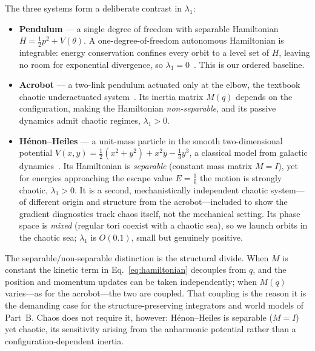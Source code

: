 \documentclass[11pt]{article}
\begin{document}
The three systems form a deliberate contrast in $\lambda_1$:
\begin{itemize}
\item \textbf{Pendulum} --- a single degree of freedom with separable Hamiltonian $H=\tfrac{1}{2}p^2 + V(\theta)$. A one-degree-of-freedom autonomous Hamiltonian is integrable: energy conservation confines every orbit to a level set of $H$, leaving no room for exponential divergence, so $\lambda_1=0$~\cite{arnold1989mathematical}. This is our ordered baseline.
\item \textbf{Acrobot} --- a two-link pendulum actuated only at the elbow, the textbook chaotic underactuated system~\cite{spong1995swing}. Its inertia matrix $M(q)$ depends on the configuration, making the Hamiltonian \emph{non-separable}, and its passive dynamics admit chaotic regimes, $\lambda_1>0$.
\item \textbf{Hénon--Heiles} --- a unit-mass particle in the smooth two-dimensional potential $V(x,y)=\tfrac{1}{2}(x^2+y^2)+x^2y-\tfrac{1}{3}y^3$, a classical model from galactic dynamics~\cite{henon1964applicability}. Its Hamiltonian is \emph{separable} (constant mass matrix $M=I$), yet for energies approaching the escape value $E=\tfrac{1}{6}$ the motion is strongly chaotic, $\lambda_1>0$. It is a second, mechanistically independent chaotic system---of different origin and structure from the acrobot---included to show the gradient diagnostics track chaos itself, not the mechanical setting. Its phase space is \emph{mixed} (regular tori coexist with a chaotic sea), so we launch orbits in the chaotic sea; $\lambda_1$ is $O(0.1)$, small but genuinely positive.
\end{itemize}

The separable/non-separable distinction is the structural divide. When $M$ is constant the kinetic term in Eq.~\eqref{eq:hamiltonian} decouples from $q$, and the position and momentum updates can be taken independently; when $M(q)$ varies---as for the acrobot---the two are coupled. That coupling is the reason it is the demanding case for the structure-preserving integrators and world models of Part~B. Chaos does not require it, however: Hénon--Heiles is separable ($M=I$) yet chaotic, its sensitivity arising from the anharmonic potential rather than a configuration-dependent inertia.
\end{document}

